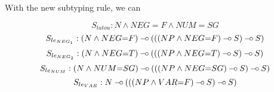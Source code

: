 With the new subtyping rule, we can

$$
S_{tatou} : N \land NEG{=}F \land NUM{=}SG
$$
$$
S_{le_{NEG_1}} : (N \land NEG{=}F) \limp (((NP \land NEG{=}F) \limp S) \limp S)
$$
$$
S_{le_{NEG_2}} : (N \land NEG{=}T) \limp (((NP \land NEG{=}T) \limp S) \limp S)
$$
$$
S_{le_{NUM}} : (N \land NUM{=}SG) \limp (((NP \land NEG{=}SG) \limp S) \limp S)
$$
$$
S_{le_{VAR}} : N \limp (((NP \land VAR{=}F) \limp S) \limp S)
$$
